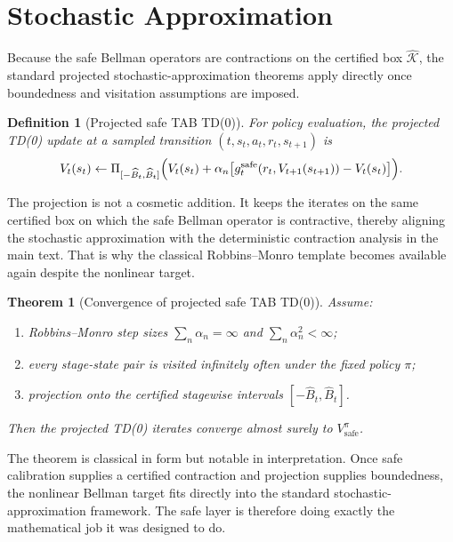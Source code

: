 \documentclass{article}
\newtheorem{theorem}{Theorem}[section]
\newtheorem{definition}[definition]{Definition}
\theoremstyle{remark}
\newcommand{\safe}{\mathrm{safe}}
\newcommand{\Ksafe}{\widehat{\mathcal K}}
\newcommand{\Bhat}{\widehat B}
\begin{document}
\section{Stochastic Approximation}
\label{sec:stochastic}

Because the safe Bellman operators are contractions on the certified box $\Ksafe$, the standard projected stochastic-approximation theorems apply directly once boundedness and visitation assumptions are imposed.

\begin{definition}[Projected safe TAB TD(0)]
\label{def:lse-td0}
For policy evaluation, the projected TD(0) update at a sampled transition $(t,s_t,a_t,r_t,s_{t+1})$ is
\begin{equation}
V_t(s_t)
\leftarrow
\Pi_{[-\Bhat_t,\Bhat_t]}
\Bigl(V_t(s_t) + \alpha_n\bigl[g_t^{\safe}(r_t,V_{t+1}(s_{t+1})) - V_t(s_t)\bigr]\Bigr).
\label{eq:safe-td0}
\end{equation}
\end{definition}

The projection is not a cosmetic addition.
It keeps the iterates on the same certified box on which the safe Bellman operator is contractive, thereby aligning the stochastic approximation with the deterministic contraction analysis in the main text.
That is why the classical Robbins--Monro template becomes available again despite the nonlinear target.

\begin{theorem}[Convergence of projected safe TAB TD(0)]
\label{thm:td0-convergence}
Assume:
\begin{enumerate}[label=(\roman*),leftmargin=1.5em,itemsep=2pt]
    \item Robbins--Monro step sizes $\sum_n \alpha_n=\infty$ and $\sum_n \alpha_n^2<\infty$;
    \item every stage-state pair is visited infinitely often under the fixed policy $\pi$;
    \item projection onto the certified stagewise intervals $[-\Bhat_t,\Bhat_t]$.
\end{enumerate}
Then the projected TD(0) iterates converge almost surely to $V_\safe^\pi$.
\end{theorem}

The theorem is classical in form but notable in interpretation.
Once safe calibration supplies a certified contraction and projection supplies boundedness, the nonlinear Bellman target fits directly into the standard stochastic-approximation framework.
The safe layer is therefore doing exactly the mathematical job it was designed to do.
\end{document}
